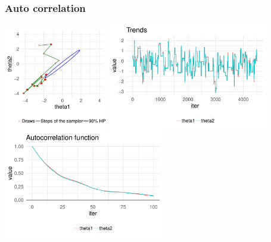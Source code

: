 \documentclass[10pt,handout]{beamer}
\begin{document}
\begin{frame}

\frametitle{ Auto correlation}

  \vspace{-0.5\baselineskip}
  \includegraphics[width=4.5cm]{figs/Metrop3.pdf}
  {\includegraphics[width=7cm]{figs/Metrop3trace.pdf}\\}
  {\includegraphics[width=7cm]{figs/Metrop3acf.pdf}}

\end{frame}
\end{document}
